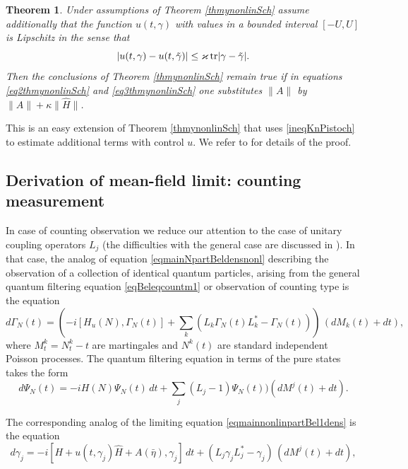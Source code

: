 \documentclass[12pt]{article}
\def\tr{\rm{tr}}
\def\ga{\gamma}
\def\ka{\varkappa}
\newtheorem{theorem}{Theorem}[section]
\newcommand{\Ga}{\Gamma}
\begin{document}
\begin{theorem}
\label{thmynonlinSchcont}
Under assumptions of Theorem \ref{thmynonlinSch} assume additionally that
the function $u(t,\ga)$ with values in a bounded interval $[-U,U]$
is Lipschitz in the sense that
\begin{equation}
\label{eq1thmynonlinSchco}
|u(t,\ga)-u(t,\tilde \ga)|\le \ka \, {\tr} |\ga -\tilde \ga|.
\end{equation}
Then the conclusions of Theorem \ref{thmynonlinSch} remain true
if in equations \eqref{eq2thmynonlinSch} and \eqref{eq3thmynonlinSch}
 one substitutes $\|A\|$ by $\|A\|+\kappa \|\hat H\|$.
\end{theorem}


 This is an easy extension of Theorem \ref{thmynonlinSch} that uses
\eqref{ineqKnPistoch} to estimate additional terms with control $u$. We refer to
\cite{KolQuantMFG} for details of the proof.

\subsection{Derivation of mean-field limit: counting measurement}
\label{seccounting}

In case of counting observation we reduce our attention to the case of unitary coupling operators $L_j$
(the difficulties with the general case are discussed in \cite{KolQuantLLN}). In that case,
the analog of equation \eqref{eqmainNpartBeldensnonl} describing the observation of a collection of
identical quantum particles, arising from the general quantum filtering equation
\eqref{eqBeleqcountm1} or observation of counting type is the equation
\begin{equation}
\label{eqmainNpartBeldensnonlcount}
d \Ga_N(t)
=\left(-i [H_u(N),\Ga_N(t)]
+\sum_k (L_k\Ga_N(t) L_k^* -\Ga_N(t))\right)\, (dM_k(t)+dt),
\end{equation}
where $M^k_t=N^k_t-t$ are martingales and $N^k(t)$ are standard independent Poisson processes.
The quantum filtering equation in terms of the pure states takes the form
\begin{equation}
\label{eqmainNpartBelnonlcount}
d \Psi_N(t)=-iH(N) \Psi_N(t) \, dt
+\sum_j (L_j-1)\Psi_N(t))  (dM^j(t)+dt).
\end{equation}

 The corresponding analog of the limiting equation \eqref{eqmainnonlinpartBel1dens} is the equation
\begin{equation}
\label{eqmainnonlinpartBel1denscount}
d \ga_j
=-i[H+u(t,\ga_j)\hat H+A(\bar \eta), \ga_j] \, dt
+(L_j\ga_j L_j^* -\ga_j)\, (dM^j(t)+dt),
\end{equation}
\end{document}
